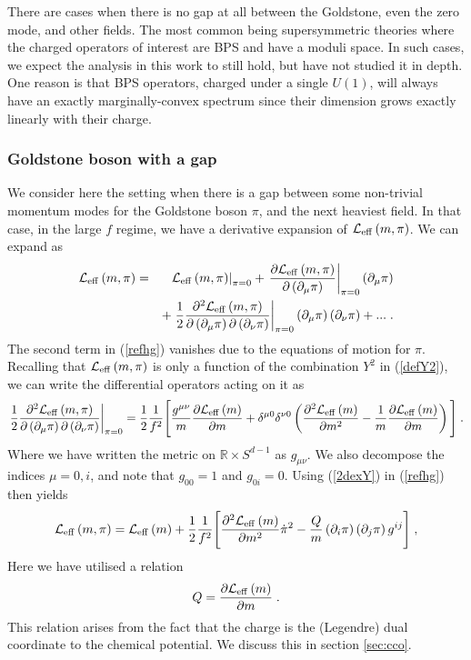 \documentclass[11pt]{article}
\numberwithin{equation}{section}
\newcommand{\be}{\begin{equation}} \newcommand{\ee}{\end{equation}}
\newcommand{\bea}{\begin{eqnarray}}  \newcommand{\eea}{\end{eqnarray}}
\newcommand{\nn}{\nonumber}
\begin{document}
There are cases when there is no gap at all between the Goldstone, even the zero mode, and other fields. The most common being supersymmetric theories where the charged operators of interest are BPS and have a moduli space. In such cases, we expect the analysis in this work to still hold, but have not studied it in depth. One reason is that BPS operators, charged under a single $U(1)$, will always have an exactly marginally-convex spectrum since their dimension grows exactly linearly with their charge.


\subsubsection{Goldstone boson with a gap}
\label{sec:gbg}

We consider here the setting when there is a gap between some non-trivial momentum modes for the Goldstone boson $\pi$, and the next heaviest field. In that case, in the large $f$ regime, we have a derivative expansion of ${\cal L}_{\mathrm{eff}}\left(m,\pi\right)$. We can expand as
\bea
{\cal L}_{\mathrm{eff}}\left(m,\pi\right) &=& \left.{\cal L}_{\mathrm{eff}}\left(m,\pi\right)\right|_{\pi=0} + \left.\frac{\partial {\cal L}_{\mathrm{eff}}\left(m,\pi\right)}{\partial \left(\partial_{\mu} \pi \right)} \right|_{\pi=0}\left(\partial_{\mu} \pi \right) \nn \\
& &+ \left.\frac12 \frac{\partial^2 {\cal L}_{\mathrm{eff}}\left(m,\pi\right)}{\partial \left(\partial_{\mu} \pi \right)\partial \left(\partial_{\nu} \pi \right)}\right|_{\pi=0}\left(\partial_{\mu} \pi \right) \left(\partial_{\nu} \pi \right) + ... \;.
\label{refhg}
\eea
The second term in (\ref{refhg}) vanishes due to the equations of motion for $\pi$. Recalling that ${\cal L}_{\mathrm{eff}}\left(m,\pi\right)$ is only a function of the combination $Y^2$ in (\ref{defY2}), we can write the differential operators acting on it as
\bea
\left.\frac12 \frac{\partial^2 {\cal L}_{\mathrm{eff}}\left(m,\pi\right)}{\partial \left(\partial_{\mu} \pi \right)\partial \left(\partial_{\nu} \pi \right)}\right|_{\pi=0} = \frac12 \frac{1}{f^2}\Bigg[\frac{g^{\mu\nu} }{m} \frac{\partial {\cal L}_{\mathrm{eff}}\left(m\right)}{\partial m} + \delta^{\mu0} \delta^{\nu0}  \left(\frac{\partial^2 {\cal L}_{\mathrm{eff}}\left(m\right)}{\partial m^2} - \frac{1}{m} \frac{\partial {\cal L}_{\mathrm{eff}}\left(m\right)}{\partial m}\right) \Bigg] \;.
\label{2dexY}
\eea
Where we have written the metric on $\mathbb{R} \times S^{d-1}$ as $g_{\mu\nu}$. We also decompose the indices $\mu = 0,i$, and note that $g_{00}=1$ and $g_{0i}=0$. Using (\ref{2dexY}) in (\ref{refhg}) then yields
\be
{\cal L}_{\mathrm{eff}}\left(m,\pi\right) = {\cal L}_{\mathrm{eff}}\left(m\right) + \frac{1}{2} \frac{1}{f^2}\Bigg[\frac{\partial^2 {\cal L}_{\mathrm{eff}}\left(m\right)}{\partial m^2} \dot{\pi}^2 - \frac{Q}{m}   \left(\partial_i \pi \right)\left(\partial_j \pi \right)g^{ij} \Bigg] \;,
\label{ltodi}
\ee
Here we have utilised a relation
\be
Q = \frac{\partial {\cal L}_{\mathrm{eff}}\left(m\right)}{\partial m} \;.
\ee 
This relation arises from the fact that the charge is the (Legendre) dual coordinate to the chemical potential. We discuss this in section \ref{sec:cco}. 
\end{document}

